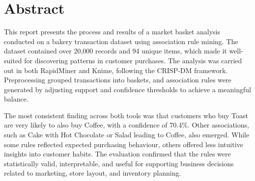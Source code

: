 \chapter*{Abstract}
\label{chap:abstract}
This report presents the process and results of a market basket analysis conducted on a bakery transaction dataset 
using association rule mining. The dataset contained over 20,000 records and 94 unique items, which made it 
well-suited for discovering patterns in customer purchases. The analysis was carried out in both RapidMiner and 
Knime, following the CRISP-DM framework. Preprocessing grouped transactions into baskets, and association rules 
were generated by adjusting support and confidence thresholds to achieve a meaningful balance.

The most consistent finding across both tools was that customers who buy Toast are very likely to also buy Coffee, 
with a confidence of 70.4\%. Other associations, such as Cake with Hot Chocolate or Salad leading to Coffee, also 
emerged. While some rules reflected expected purchasing behaviour, others offered less intuitive insights into 
customer habits. The evaluation confirmed that the rules were statistically valid, interpretable, and useful for 
supporting business decisions related to marketing, store layout, and inventory planning.